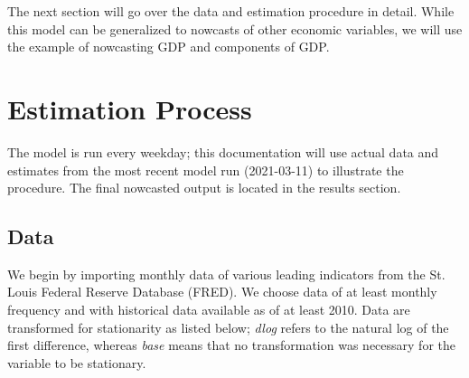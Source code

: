 \documentclass[11pt, letterpaper]{article}\usepackage[]{graphicx}\usepackage[]{color}
\begin{document}
The next section will go over the data and estimation procedure in detail. While this model can be generalized to nowcasts of other economic variables, we will use the example of nowcasting GDP and components of GDP.

\newpage
\section{Estimation Process}
The model is run every weekday; this documentation will use actual data and estimates from the most recent model run (2021-03-11) to illustrate the procedure. The final nowcasted output is located in the results section.

\subsection{Data}
We begin by importing monthly data of various leading indicators from the St. Louis Federal Reserve Database (FRED). We choose data of at least monthly frequency and with historical data available as of at least 2010. Data are transformed for stationarity as listed below; \textit{dlog} refers to the natural log of the first difference, whereas \textit{base} means that no transformation was necessary for the variable to be stationary.
\end{document}
